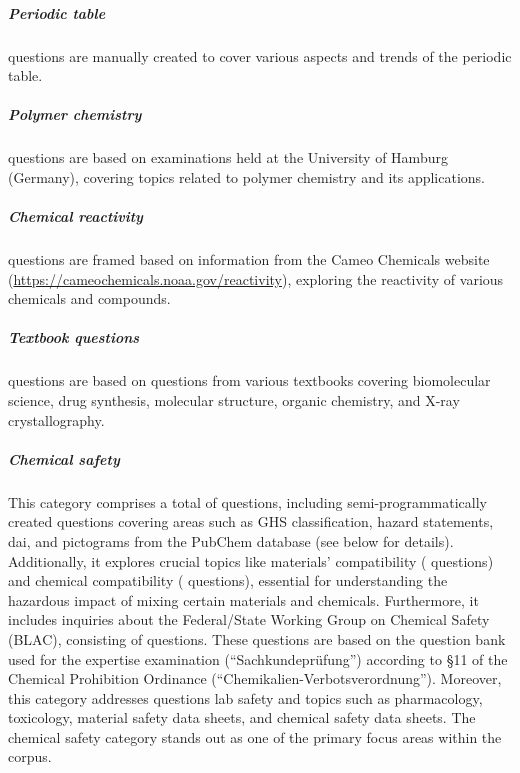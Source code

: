 \documentclass[11pt, oneside]{article}
\begin{document}
\begin{refsection}
\subparagraph{Periodic table}
 questions are manually created to cover various aspects and trends of the periodic table.

\subparagraph{Polymer chemistry}
 questions are based on examinations held at the University of Hamburg (Germany), covering topics related to polymer chemistry and its applications.

\subparagraph{Chemical reactivity}
 questions are framed based on information from the Cameo Chemicals website (\url{https://cameochemicals.noaa.gov/reactivity}), exploring the reactivity of various chemicals and compounds.

\subparagraph{Textbook questions}
 questions are based on questions from various textbooks covering biomolecular science, drug synthesis, molecular structure, organic chemistry, and X-ray crystallography.

\subparagraph{Chemical safety} 
This category comprises a total of  questions, including semi-programmatically created questions covering areas such as GHS classification, hazard statements, \gls{dai}, and pictograms from the PubChem database \autocite{pubchem} (see below for details). 
Additionally, it explores crucial topics like materials' compatibility ( questions) and chemical compatibility ( questions), essential for understanding the hazardous impact of mixing certain materials and chemicals. 
Furthermore, it includes inquiries about the Federal/State Working Group on Chemical Safety (BLAC), consisting of  questions. 
These questions are based on the question bank used for the expertise examination (\enquote{Sachkundeprüfung}) according to §11 of the Chemical Prohibition Ordinance (\enquote{Chemikalien-Verbotsverordnung}).
Moreover, this category addresses questions lab safety and topics such as pharmacology, toxicology, material safety data sheets, and chemical safety data sheets. 
The chemical safety category stands out as one of the primary focus areas within the \chembench corpus.


\end{refsection}
\end{document}
